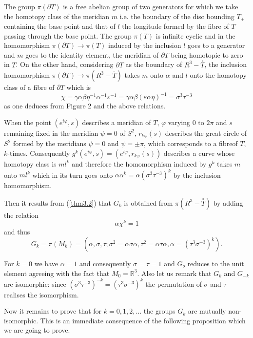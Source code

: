 The group $\pi (\partial T)$ is a free abelian group of two generators
for which we take the homotopy class of the meridian $m$ i.e. the
boundary of the disc bounding $T_+$ containing the base point and that
of $l$ the longitude formed by the fibre of $T$ passing through the base
point. The group $\pi (T)$ is infinite cyclic and in the homomorphism
$\pi (\partial T) \to \pi (T)$ induced by the inclusion $l$ goes to a
generator and $m$ goes to the identity element, the meridian of
$\partial T$ being homotopic to zero in $T$. On the other hand,
considering $\partial T$ as the boundary of $R^3 - \overset{\circ}{T}$,
the inclusion homomorphism $\pi (\partial T) \to \pi ( R^3 -
\overset{\circ}{T})$ takes $m$ onto $\alpha$ and $l$ onto the homotopy
class of a fibre of $\partial T$ which is  
$$
\chi = \gamma \alpha \beta \eta^{-1} \alpha^{-1} \varepsilon^{-1} =
\gamma \alpha \beta (\varepsilon \alpha \eta)^{-1} = \sigma^3
\tau^{-3} 
$$
as one deduces from Figure 2 and the above relations.

When the point $(e^{i \varphi}, s)$ describes a meridian of $T$,
$\varphi$ varying 0 to $2 \pi$ and $s$ remaining fixed in the
meridian $\psi = 0$ of $S^2$, $r_{k \varphi} (s)$ describes the great
circle of $S^2$ formed by the meridians $\psi = 0$ and $\psi = \pm
\pi$, which corresponds to a fibre\pageoriginale of $T$,
$k$-times. Consequently 
$g^k (e^{i \varphi}, s) = (e^{i \varphi}, r_{k \varphi} (s))$
describes a curve whose homotopy class is $ml^k$ and therefore the
homomorphism induced by $g^k$ takes $m$ onto $ml^k$ which in its turn
goes onto $\alpha \alpha^k = \alpha (\sigma^3 \tau^{-3} )^k$ by the
inclusion homomorphism.  

Then it results from (\ref{thm3.2}) that $G_k$ is obtained from $\pi (R^3 -
\overset{\circ}{T})$ by adding the relation 
$$
\alpha \chi^k = 1 
$$
and thus
$$
G_k = \pi (M_k) = (\alpha, \sigma, \tau; \sigma^2 = \alpha \sigma
\alpha, \tau^2 = \alpha \tau \alpha, \alpha = (\tau^3
\sigma^{-3})^k). 
$$

For $k = 0$ we have $\alpha = 1$ and consequently $\sigma = \tau =1$
and $G_o$ reduces to the unit element agreeing with the fact that $M_0
= \mathbb{R}^3$. Also let us remark that $G_k$ and $G_{-k}$ are
isomorphic: since $(\sigma^3 \tau^{-3} )^{-k} = (\tau^3 \sigma^{-3})^k$
the permutation of $\sigma$ and $\tau$ realises the isomorphism. 

Now it remains to prove that for $k = 0, 1, 2,\ldots$ the groups
$G_k$ are mutually non- isomorphic. This is an immediate consequence of
the following proposition which we are going to prove. 


